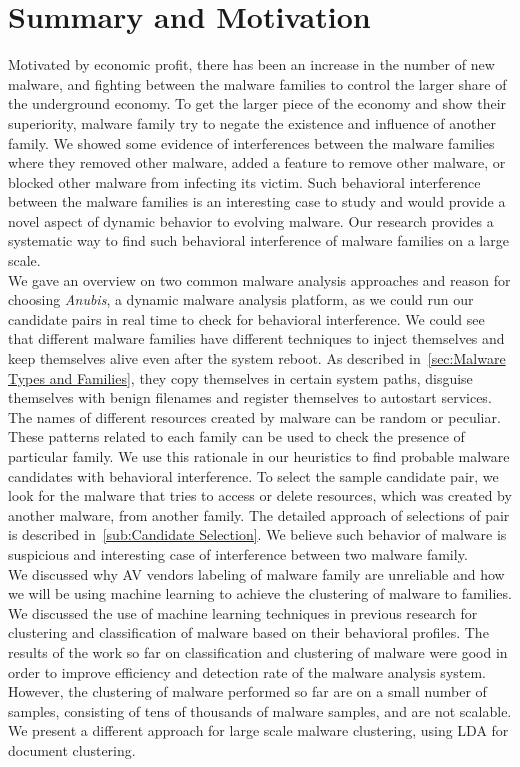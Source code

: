 \section{Summary and Motivation}
\label{sec:Motivation}
Motivated by economic profit, there has been an increase in the number of new malware, and fighting between the malware families to control the larger share of the underground economy.
To get the larger piece of the economy and show their superiority, malware family try to negate the existence and influence of another family.
We showed some evidence of interferences between the malware families where they removed other malware, added a feature to remove other malware, or blocked other malware from infecting its victim.
Such behavioral interference between the malware families is an interesting case to study and would provide a novel aspect of dynamic behavior to evolving malware.
Our research provides a systematic way to find such behavioral interference of malware families on a large scale.
\\

We gave an overview on two common malware analysis approaches and reason for choosing \emph{Anubis}, a dynamic malware analysis platform, as we could run our candidate pairs in real time to check for behavioral interference.
We could see that different malware families have different techniques to inject themselves and keep themselves alive even after the system reboot.
As described in~\autoref{sec:Malware Types and Families}, they copy themselves in certain system paths, disguise themselves with benign filenames and register themselves to autostart services.
The names of different resources created by malware can be random or peculiar.
These patterns related to each family can be used to check the presence of particular family.
We use this rationale in our heuristics to find probable malware candidates with behavioral interference.
To select the sample candidate pair, we look for the malware that tries to access or delete resources, which was created by another malware, from another family.
The detailed approach of selections of pair is described in~\autoref{sub:Candidate Selection}.
We believe such behavior of malware is suspicious and interesting case of interference between two malware family.\\

We discussed why AV vendors labeling of malware family are unreliable and how we will be using machine learning to achieve the clustering of malware to families.
We discussed the use of machine learning techniques in previous research for clustering and classification of malware based on their behavioral profiles.
The results of the work so far on classification and clustering of malware were good in order to improve efficiency and detection rate of the malware analysis system.
However, the clustering of malware performed so far are on a small number of samples, consisting of tens of thousands of malware samples, and are not scalable.
We present a different approach for large scale malware clustering, using LDA for document clustering.\\

